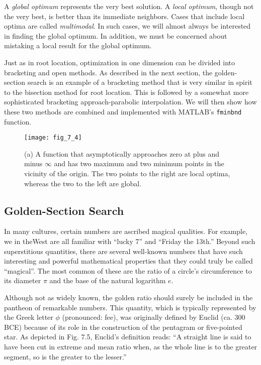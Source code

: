 \documentclass[../main.tex]{subfiles}
\begin{document}
A \textit{global optimum} represents the very best solution. A \textit{local optimum}, though not the
very best, is better than its immediate neighbors. Cases that include local optima are called
\textit{multimodal}. In such cases, we will almost always be interested in finding the global optimum.
In addition, we must be concerned about mistaking a local result for the global optimum.

Just as in root location, optimization in one dimension can be divided into bracketing
and open methods. As described in the next section, the golden-section search is an example
of a bracketing method that is very similar in spirit to the bisection method for root location.
This is followed by a somewhat more sophisticated bracketing approach-parabolic interpolation.
We will then show how these two methods are combined and implemented with
MATLAB's \texttt{fminbnd} function.

\begin{figure}[H]
	\centering
	\texttt{[image: fig\_7\_4]}
	\caption{\textsf{(a) A function that asymptotically approaches zero at plus and minus $\infty$ and has two maximum and
	two minimum points in the vicinity of the origin. The two points to the right are local optima,
	whereas the two to the left are global.}}
	\label{fig:fig_7_4}
\end{figure}

\subsection{Golden-Section Search}

In many cultures, certain numbers are ascribed magical qualities. For example, we in theWest
are all familiar with ``lucky 7'' and ``Friday the 13th.'' Beyond such superstitious quantities,
there are several well-known numbers that have such interesting and powerful mathematical
properties that they could truly be called ``magical''. The most common of these are the ratio
of a circle's circumference to its diameter $\pi$ and the base of the natural logarithm $e$.

Although not as widely known, the golden ratio should surely be included in the pantheon
of remarkable numbers. This quantity, which is typically represented by the Greek
letter $\phi$ (pronounced: fee), was originally defined by Euclid (ca. 300 BCE) because of its
role in the construction of the pentagram or five-pointed star. As depicted in Fig. 7.5,
Euclid's definition reads: ``A straight line is said to have been cut in extreme and mean ratio
when, as the whole line is to the greater segment, so is the greater to the lesser.''
\end{document}
